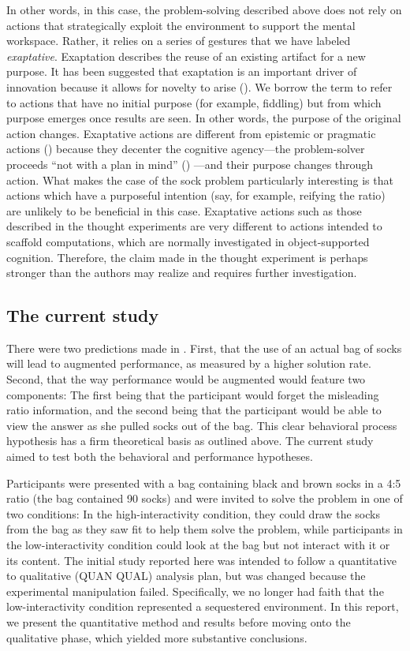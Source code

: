 \documentclass[twocolumn, serif, empirical, authordate]{jote-article}
\begin{document}
In other words, in this case, the problem-solving described above does not rely on actions that strategically exploit the environment to support the mental workspace. Rather, it relies on a series of gestures that we have labeled \emph{exaptative}. Exaptation describes the reuse of an existing artifact for a new purpose. It has been suggested that exaptation is an important driver of innovation because it allows for novelty to arise (). We borrow the term to refer to actions that have no initial purpose (for example, fiddling) but from which purpose emerges once results are seen. In other words, the purpose of the original action changes. Exaptative actions are different from epistemic or pragmatic actions () because they decenter the cognitive agency---the problem-solver proceeds ``not with a plan in mind'' () ---and their purpose changes through action. What makes the case of the sock problem particularly interesting is that actions which have a purposeful intention (say, for example, reifying the ratio) are unlikely to be beneficial in this case. Exaptative actions such as those described in the thought experiments are very different to actions intended to scaffold computations, which are normally investigated in object-supported cognition. Therefore, the claim made in the thought experiment is perhaps stronger than the authors may realize and requires further investigation. 

\subsection*{The current study}

There were two predictions made in \textcite{Vallee-Tourangeau2020}. First, that the use of an actual bag of socks will lead to augmented performance, as measured by a higher solution rate. Second, that the way performance would be augmented would feature two components: The first being that the participant would forget the misleading ratio information, and the second being that the participant would be able to view the answer as she pulled socks out of the bag. This clear behavioral process hypothesis has a firm theoretical basis as outlined above. The current study aimed to test both the behavioral and performance hypotheses. 

Participants were presented with a bag containing black and brown socks in a 4:5 ratio (the bag contained 90 socks) and were invited to solve the problem in one of two conditions: In the high-interactivity condition, they could draw the socks from the bag as they saw fit to help them solve the problem, while participants in the low-interactivity condition could look at the bag but not interact with it or its content. The initial study reported here was intended to follow a quantitative to qualitative (QUAN QUAL) analysis plan, but was changed because the experimental manipulation failed. Specifically, we no longer had faith that the low-interactivity condition represented a sequestered environment. In this report, we present the quantitative method and results before moving onto the qualitative phase, which yielded more substantive conclusions. 
\end{document}
